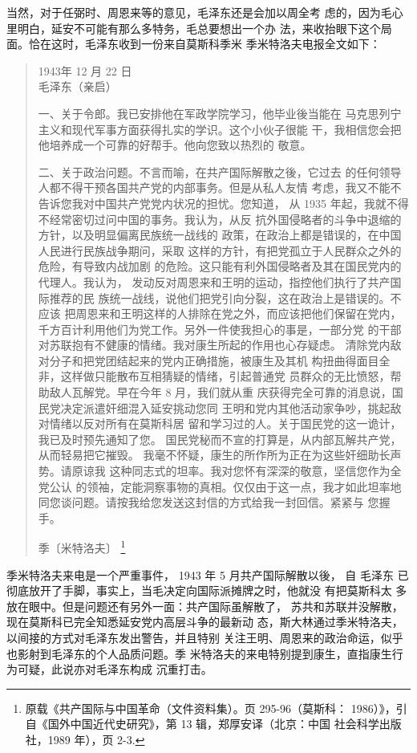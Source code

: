 当然，对于任弼时、周恩来等的意见，毛泽东还是会加以周全考
虑的，因为毛心里明白，延安不可能有那么多特务，毛总要想出一个办
法，来收抬眼下这个局面。恰在这时，毛泽东收到一份来自莫斯科季米
季米特洛夫电报全文如下：
\begin{quote}
	\fzwkai 
\noindent	
	1943年 12 月 22 日
\\毛泽东（亲启）

一、关于令郎。我已安排他在军政学院学习，他毕业後当能在
马克思列宁主义和现代军事方面获得扎实的学识。这个小伙子很能
干，我相信您会把他培养成一个可靠的好帮手。他向您致以热烈的
敬意。

二、关于政治问题。不言而喻，在共产国际解散之後，它过去
的任何领导人都不得干预各国共产党的内部事务。但是从私人友情
考虑，我又不能不告诉您我对中国共产党党内状况的担忧。您知道，
从 1935 年起，我就不得不经常密切过问中国的事务。我认为，从反
抗外国侵略者的斗争中退缩的方针，以及明显偏离民族统一战线的
政策，在政治上都是错误的，在中国人民进行民族战争期问，采取
这样的方针，有把党孤立于人民群众之外的危险，有导致内战加剧
的危险。这只能有利外国侵略者及其在国民党内的代理人。我认为，
发动反对周恩来和王明的运动，指控他们执行了共产国际推荐的民
族统一战线，说他们把党引向分裂，这在政治上是错误的。不应该
把周恩来和王明这样的人排除在党之外，而应该把他们保留在党内，
千方百计利用他们为党工作。另外一件使我担心的事是，一部分党
的干部对苏联抱有不健康的情绪。我对康生所起的作用也心存疑虑。
清除党内敌对分子和把党团结起来的党内正确措施，被康生及其机
构扭曲得面目全非，这样做只能散布互相猜疑的情绪，引起普通党
员群众的无比愤怒，帮助敌人瓦解党。早在今年 8 月，我们就从重
庆获得完全可靠的消息说，国民党决定派遣奸细混入延安挑动您同
王明和党内其他活动家争吵，挑起敌对情绪以反对所有在莫斯科居
留和学习过的人。关于国民党的这一诡计，我已及时预先通知了您。
国民党秘而不宣的打算是，从内部瓦解共产党，从而轻易把它摧毁。
我毫不怀疑，康生的所作所为正在为这些奸细助长声势。请原谅我
这种同志式的坦率。我对您怀有深深的敬意，坚信您作为全党公认
的领袖，定能洞察事物的真相。仅仅由于这一点，我才如此坦率地
同您谈问题。请按我给您发送这封信的方式给我一封回信。紧紧与
您握手。

\bigskip\mbox{}\large\hfill 季〔米特洛夫〕
\footnote{原载《共产国际与中国革命（文件资料集）。页 295-96（莫斯科：
1986）》，引自《国外中国近代史研究》，第 13 辑，郑厚安译（北京：中国
社会科学出版社，1989 年），页 2-3.} \end{quote}

 季米特洛夫来电是一个严重事件， 1943 年 5 月共产国际解散以後， 自 毛泽东
 已彻底放开了手脚，事实上，当毛决定向国际派摊牌之时，他就没 有把莫斯科太
 多放在眼中。但是问题还有另外一面：共产国际虽解散了， 苏共和苏联并没解散，
 现在莫斯科已完全知悉延安党内高层斗争的最新动 态，斯大林通过季米特洛夫，
 以间接的方式对毛泽东发出警告，并且特别 关注王明、周恩来的政治命运，似乎
 也影射到毛泽东的个人品质问题。季 米特洛夫的来电特别提到康生，直指康生行
 为可疑，此说亦对毛泽东构成 沉重打击。

